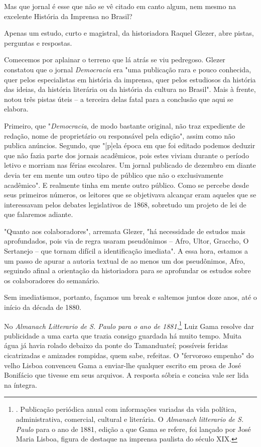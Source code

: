 Mas que jornal é esse que não se vê citado em canto algum, nem mesmo na
excelente História da Imprensa no Brasil?

Apenas um estudo, curto e magistral, da historiadora Raquel Glezer, abre
pistas, perguntas e respostas.

Comecemos por aplainar o terreno que lá atrás se viu pedregoso. Glezer
constatou que o jornal \emph{Democracia} era "uma publicação rara e
pouco conhecida, quer pelos especialistas em história da imprensa, quer
pelos estudiosos da história das ideias, da história literária ou da
história da cultura no Brasil". Mais à frente, notou três pistas úteis
-- a terceira delas fatal para a conclusão que aqui se elabora.

Primeiro, que "\emph{Democracia}, de modo bastante original, não traz
expediente de redação, nome de proprietário ou responsável pela edição",
assim como não publica anúncios. Segundo, que "{[}p{]}ela época em que
foi editado podemos deduzir que não fazia parte dos jornais acadêmicos,
pois estes viviam durante o período letivo e morriam nas férias
escolares. Um jornal publicado de dezembro em diante devia ter em mente
um outro tipo de público que não o exclusivamente acadêmico". E
realmente tinha em mente outro público. Como se percebe desde seus
primeiros números, os leitores que se objetivava alcançar eram aqueles
que se interessavam pelos debates legislativos de 1868, sobretudo um
projeto de lei de que falaremos adiante.

"Quanto aos colaboradores", arremata Glezer, "há necessidade de estudos
mais aprofundados, pois via de regra usaram pseudônimos -- Afro, Ultor,
Graccho, O Sertanejo -- que tornam difícil a identificação imediata". A
essa hora, estamos a um passo de apurar a autoria textual de ao menos um
dos pseudônimos, Afro, seguindo afinal a orientação da historiadora para
se aprofundar os estudos sobre os colaboradores do semanário.

Sem imediatismos, portanto, façamos um break e saltemos juntos doze
anos, até o início da década de 1880.

No \emph{Almanach Litterario de S. Paulo para o ano de 1881},\footnote{.
  Publicação periódica anual com informações variadas da vida política,
  administrativa, comercial, cultural e literária. O \emph{Almanach
  litterario de S. Paulo} para o ano de 1881, edição a que Gama se
  refere, foi lançado por José Maria Lisboa, figura de destaque na
  imprensa paulista do século XIX.} Luiz Gama resolve dar publicidade a
uma carta que trazia consigo guardada há muito tempo. Muita água já
havia rolado debaixo da ponte do Tamanduateí; possíveis feridas
cicatrizadas e amizades rompidas, quem sabe, refeitas. O "fervoroso
empenho" do velho Lisboa convenceu Gama a enviar-lhe qualquer escrito em
prosa de José Bonifácio que tivesse em seus arquivos. A resposta sóbria
e concisa vale ser lida na íntegra.

